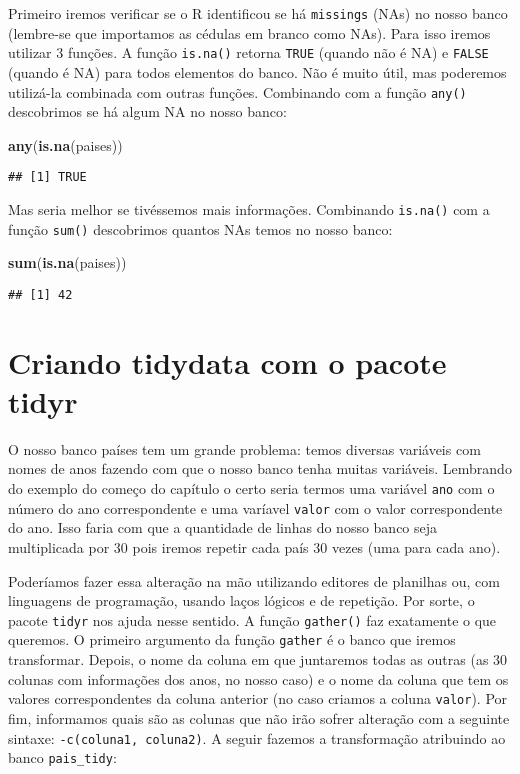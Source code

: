 \documentclass[]{book}
\newenvironment{Shaded}{\begin{snugshade}}{\end{snugshade}}
\newcommand{\KeywordTok}[1]{\textcolor[rgb]{0.13,0.29,0.53}{\textbf{#1}}}
\newcommand{\NormalTok}[1]{#1}
\theoremstyle{definition}
\theoremstyle{definition}
\theoremstyle{definition}
\theoremstyle{remark}
\begin{document}
Primeiro iremos verificar se o R identificou se há \texttt{missings} (NAs) no nosso banco (lembre-se que importamos as cédulas em branco como NAs). Para isso iremos utilizar 3 funções. A função \texttt{is.na()} retorna \texttt{TRUE} (quando não é NA) e \texttt{FALSE} (quando é NA) para todos elementos do banco. Não é muito útil, mas poderemos utilizá-la combinada com outras funções. Combinando com a função \texttt{any()} descobrimos se há algum NA no nosso banco:

\begin{Shaded}
\begin{Highlighting}[]
\KeywordTok{any}\NormalTok{(}\KeywordTok{is.na}\NormalTok{(paises))}
\end{Highlighting}
\end{Shaded}

\begin{verbatim}
## [1] TRUE
\end{verbatim}

Mas seria melhor se tivéssemos mais informações. Combinando \texttt{is.na()} com a função \texttt{sum()} descobrimos quantos NAs temos no nosso banco:

\begin{Shaded}
\begin{Highlighting}[]
\KeywordTok{sum}\NormalTok{(}\KeywordTok{is.na}\NormalTok{(paises))}
\end{Highlighting}
\end{Shaded}

\begin{verbatim}
## [1] 42
\end{verbatim}

\hypertarget{criando-tidydata-com-o-pacote-tidyr}{%
\section{Criando tidydata com o pacote tidyr}\label{criando-tidydata-com-o-pacote-tidyr}}

O nosso banco países tem um grande problema: temos diversas variáveis com nomes de anos fazendo com que o nosso banco tenha muitas variáveis. Lembrando do exemplo do começo do capítulo o certo seria termos uma variável \texttt{ano} com o número do ano correspondente e uma varíavel \texttt{valor} com o valor correspondente do ano. Isso faria com que a quantidade de linhas do nosso banco seja multiplicada por 30 pois iremos repetir cada país 30 vezes (uma para cada ano).

Poderíamos fazer essa alteração na mão utilizando editores de planilhas ou, com linguagens de programação, usando laços lógicos e de repetição. Por sorte, o pacote \texttt{tidyr} nos ajuda nesse sentido. A função \texttt{gather()} faz exatamente o que queremos. O primeiro argumento da função \texttt{gather} é o banco que iremos transformar. Depois, o nome da coluna em que juntaremos todas as outras (as 30 colunas com informações dos anos, no nosso caso) e o nome da coluna que tem os valores correspondentes da coluna anterior (no caso criamos a coluna \texttt{valor}). Por fim, informamos quais são as colunas que não irão sofrer alteração com a seguinte sintaxe: \texttt{-c(coluna1,\ coluna2)}. A seguir fazemos a transformação atribuindo ao banco \texttt{pais\_tidy}:
\end{document}
